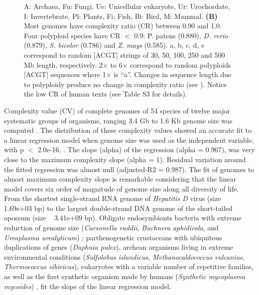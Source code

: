 \begin{figure}[htpb]
{A: Archaea, Fu: Fungi, Ue: Unicellular eukaryote, Ur: Urochordate, I: Invertebrate, Pl: Plants, Fi: Fish, Bi: Bird, M: Mammal. \textbf{(B)} Most genomes have complexity ratio (CR) between 0.90 and 1.0. Four polyploid species have CR $<$ 0.9: P. patens (0.880), \textit{D. rerio} (0.879), \textit{S. bicolor} (0.786) and \textit{Z. mays} (0.585). a, b, c, d, e correspond to random [ACGT] strings of 30, 50, 100, 250 and 500 Mb length, respectively. 2$\times$ to 6$\times$ correspond to random polyploids [ACGT] sequences where 1$\times$ is ``a''. Changes in sequence length due to polyploidy produce no change in complexity ratio (see ). Notice the low CR of human texts (see Table S3 for details).
}
\label{fig:gen_compl}
\end{figure}


Complexity value (CV) of complete genomes of 54 species of twelve major systematic groups of organisms, ranging 3.4 Gb to 1.6 Kb genome size was computed . The distribution of these complexity values showed an accurate fit to a linear regression model when genome size was used as the independent variable, with p $<$ 2.0e-16, . The slope (alpha) of the regression (alpha = 0.967), was very close to the maximum complexity slope (alpha = 1). Residual variation around the fitted regression was almost null (adjusted-R2 = 0.987). The fit of genomes to almost maximum complexity slope is remarkable considering that the linear model covers six order of magnitude of genome size along all diversity of life. From the shortest single-strand RNA genome of \textit{Hepatitis D} virus (size ~ 1.69e+03 bp) to the largest double-strand DNA genome of the short-tailed opossum (size ~ 3.41e+09 bp). Obligate endosymbionts bacteria with extreme reduction of genome size (\textit{Carsonella ruddii}, \textit{Buchnera aphidicola}, and \textit{Ureaplasma urealyticum}) \cite{Wernegreen2002}; parthenogenetic crustaceans with ubiquitous duplications of genes (\textit{Daphnia pulex}), archean organisms living in extreme environmental conditions (\textit{Sulfolobus islandicus}, \textit{Methanocaldococcus vulcanius}, \textit{Thermococcus sibiricus}), eukaryotes with a variable number of repetitive families, as well as the first synthetic organism made by humans (\textit{Synthetic mycoplasma mycoides}) \cite{Gibson2010}, fit the slope of the linear regression model. 


